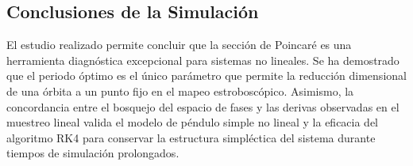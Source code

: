\subsection{Conclusiones de la Simulación}

El estudio realizado permite concluir que la sección de Poincaré es una herramienta diagnóstica excepcional para sistemas no lineales. Se ha demostrado que el periodo óptimo es el único parámetro que permite la reducción dimensional de una órbita a un punto fijo en el mapeo estroboscópico. Asimismo, la concordancia entre el bosquejo del espacio de fases y las derivas observadas en el muestreo lineal valida el modelo de péndulo simple no lineal y la eficacia del algoritmo RK4 para conservar la estructura simpléctica del sistema durante tiempos de simulación prolongados.
